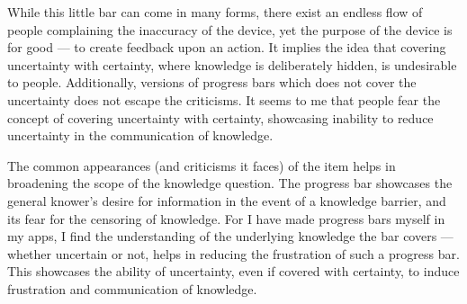 \documentclass[a4paper,12pt]{article}
\begin{document}
While this little bar can come in many forms, there exist an endless flow of people complaining the inaccuracy of the device, yet the purpose of the device is for good --- to create feedback upon an action. It implies the idea that covering uncertainty with certainty, where knowledge is deliberately hidden, is undesirable to people. Additionally, versions of progress bars which does not cover the uncertainty does not escape the criticisms. It seems to me that people fear the concept of covering uncertainty with certainty, showcasing inability to reduce uncertainty in the communication of knowledge.

The common appearances (and criticisms it faces) of the item helps in broadening the scope of the knowledge question. The progress bar showcases the general knower's desire for information in the event of a knowledge barrier, and its fear for the censoring of knowledge. For I have made progress bars myself in my apps, I find the understanding of the underlying knowledge the bar covers --- whether uncertain or not, helps in reducing the frustration of such a progress bar. This showcases the ability of uncertainty, even if covered with certainty, to induce frustration and communication of knowledge.


\newpage
\nocite{*}
\printbibliography
\end{document}
